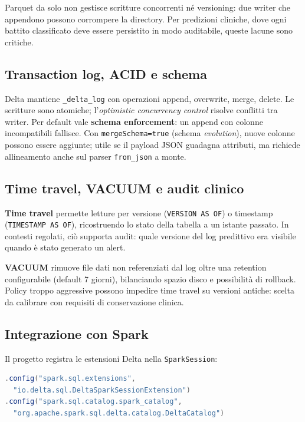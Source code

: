 Parquet da solo non gestisce scritture concorrenti né versioning: due writer che appendono possono corrompere la directory.
Per predizioni cliniche, dove ogni battito classificato deve essere persistito in modo auditabile, queste lacune sono critiche.

\subsection{Transaction log, ACID e schema}

Delta mantiene \texttt{\_delta\_log} con operazioni append, overwrite, merge, delete.
Le scritture sono atomiche; l'\emph{optimistic concurrency control} risolve conflitti tra writer.
Per default vale \textbf{schema enforcement}: un append con colonne incompatibili fallisce.
Con \texttt{mergeSchema=true} (schema \emph{evolution}), nuove colonne possono essere aggiunte; utile se il payload JSON guadagna attributi, ma richiede allineamento anche sul parser \texttt{from\_json} a monte.

\subsection{Time travel, VACUUM e audit clinico}

\textbf{Time travel} permette letture per versione (\texttt{VERSION AS OF}) o timestamp (\texttt{TIMESTAMP AS OF}), ricostruendo lo stato della tabella a un istante passato.
In contesti regolati, ciò supporta audit: quale versione del log predittivo era visibile quando è stato generato un alert.

\textbf{VACUUM} rimuove file dati non referenziati dal log oltre una retention configurabile (default 7 giorni), bilanciando spazio disco e possibilità di rollback.
Policy troppo aggressive possono impedire time travel su versioni antiche: scelta da calibrare con requisiti di conservazione clinica.

\subsection{Integrazione con Spark}

Il progetto registra le estensioni Delta nella \texttt{SparkSession}:

\begin{lstlisting}[language=Scala,caption={Configurazione Delta Lake in SparkSession.},label={lst:delta-config}]
.config("spark.sql.extensions",
  "io.delta.sql.DeltaSparkSessionExtension")
.config("spark.sql.catalog.spark_catalog",
  "org.apache.spark.sql.delta.catalog.DeltaCatalog")
\end{lstlisting}

